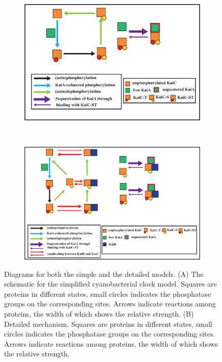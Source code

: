 \documentclass[a4paper,10pt]{article}
\numberwithin{equation}{section}
\begin{document}
 \begin{figure}
\centering
\begin{subfigure}{0.7\textwidth}
\centering
\includegraphics[scale=0.52]{core_model.eps}
\caption{}\label{simplemodel}
\end{subfigure}
~
\begin{subfigure}{0.7\textwidth}
\centering
\includegraphics[scale=0.4]{detailed_model.eps}
\caption{}
\label{fig:diagram}
\end{subfigure}
\caption{ Diagrams for both the simple and the detailed models. (A) The schematic for the simplified cyanobacterial clock model. Squares are proteins in different states, small circles indicates the phosphatase groups on the corresponding sites. Arrows indicate reactions among proteins, the width of which shows the relative strength. (B) Detailed mechanism. Squares are proteins in different states, small circles indicates the phosphatase groups on the corresponding sites. Arrows indicate reactions among proteins, the width of which shows the relative strength.}
\end{figure}
\end{document}
